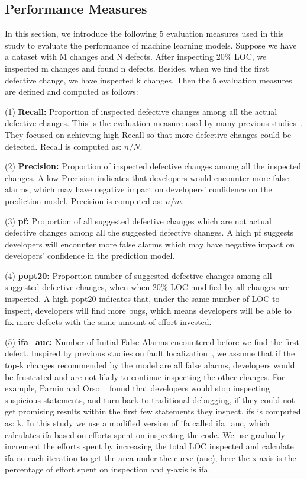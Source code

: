 \documentclass[10pt,journal,compsoc]{IEEEtran}
\begin{document}
\subsection{Performance Measures}
\label{sec:Measures}

In this section, we introduce the following 5 evaluation measures used in this study to evaluate the performance of machine learning models. Suppose we have a dataset with M changes and N defects. After inspecting 20\% LOC, we inspected m changes and found n defects. Besides, when we find the first defective change, we have inspected k changes. Then the 5 evaluation measures are defined and computed as follows:

(1) \textbf{Recall:} Proportion of inspected defective changes among all the actual defective changes. This is the evaluation measure used by many previous studies~\cite{kamei2012large,yang2016effort,yang2017tlel,xia2016collective,yang2015deep}. They focused on achieving high Recall so that more defective changes could be detected. Recall is computed as: $n/N$.

(2) \textbf{Precision:} Proportion of inspected defective changes among all the inspected changes. A low Precision indicates that developers would encounter more false alarms, which may have negative impact on developers' confidence on the prediction model. Precision is computed as: $n/m$.

(3) \textbf{pf:} Proportion of all suggested defective changes which are not actual defective changes among all the suggested defective changes. A high pf suggests developers will encounter more false alarms which may have negative impact on developers' confidence in the prediction model.

(4) \textbf{popt20:} Proportion number of suggested defective changes among all suggested defective changes, when when 20\% LOC modified by all changes are inspected. A high popt20 indicates that, under the same number of LOC to inspect, developers will find more bugs, which means developers will be able to fix more defects with the same amount of effort invested.

(5) \textbf{ifa\_auc:} Number of Initial False Alarms encountered before we find the first defect. Inspired by previous studies on fault localization~\cite{parnin2011automated,kochhar2016practitioners,xia2016automated}, we assume that if the top-k changes recommended by the model are all false alarms, developers would be frustrated and are not likely to continue inspecting the other changes. For example, Parnin and Orso ~\cite{parnin2011automated} found that developers would stop inspecting suspicious statements, and turn back to traditional debugging, if they could not get promising results within the first few statements they inspect. ifs is computed as: k. In this study we use a modified version of ifa called ifa\_auc, which calculates ifa based on efforts spent on inspecting the code. We use gradually increment the efforts spent by increasing the total LOC inspected and calculate ifa on each iteration to get the area under the curve (auc), here the x-axis is the percentage of effort spent on inspection and y-axis is ifa.
\end{document}
